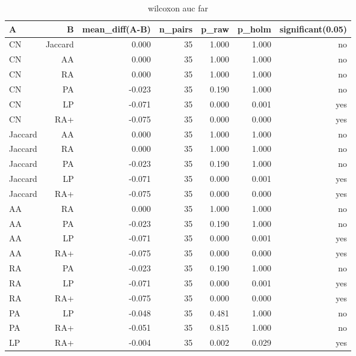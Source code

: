 \begin{table}[t]
\centering
\caption{wilcoxon auc far}
\label{tab:wilcoxon_auc_far}
\begin{tabular}{lrrrrrr}
\hline
A & B & mean\_diff(A-B) & n\_pairs & p\_raw & p\_holm & significant(0.05) \\
\hline
CN & Jaccard & 0.000 & 35 & 1.000 & 1.000 & no \\
CN & AA & 0.000 & 35 & 1.000 & 1.000 & no \\
CN & RA & 0.000 & 35 & 1.000 & 1.000 & no \\
CN & PA & -0.023 & 35 & 0.190 & 1.000 & no \\
CN & LP & -0.071 & 35 & 0.000 & 0.001 & yes \\
CN & RA+ & -0.075 & 35 & 0.000 & 0.000 & yes \\
Jaccard & AA & 0.000 & 35 & 1.000 & 1.000 & no \\
Jaccard & RA & 0.000 & 35 & 1.000 & 1.000 & no \\
Jaccard & PA & -0.023 & 35 & 0.190 & 1.000 & no \\
Jaccard & LP & -0.071 & 35 & 0.000 & 0.001 & yes \\
Jaccard & RA+ & -0.075 & 35 & 0.000 & 0.000 & yes \\
AA & RA & 0.000 & 35 & 1.000 & 1.000 & no \\
AA & PA & -0.023 & 35 & 0.190 & 1.000 & no \\
AA & LP & -0.071 & 35 & 0.000 & 0.001 & yes \\
AA & RA+ & -0.075 & 35 & 0.000 & 0.000 & yes \\
RA & PA & -0.023 & 35 & 0.190 & 1.000 & no \\
RA & LP & -0.071 & 35 & 0.000 & 0.001 & yes \\
RA & RA+ & -0.075 & 35 & 0.000 & 0.000 & yes \\
PA & LP & -0.048 & 35 & 0.481 & 1.000 & no \\
PA & RA+ & -0.051 & 35 & 0.815 & 1.000 & no \\
LP & RA+ & -0.004 & 35 & 0.002 & 0.029 & yes \\
\hline
\end{tabular}
\end{table}